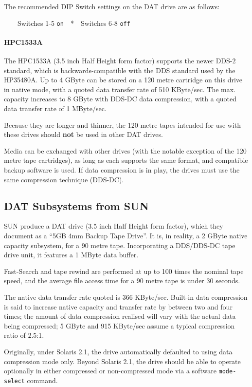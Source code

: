 The recommended DIP Switch settings on the DAT drive are as follows:

\ \ \ \ Switches 1-5 {\tt on}\ \ *\ \ Switches 6-8 {\tt off}

\paragraph {HPC1533A}

The HPC1533A (3.5 inch Half Height form factor) supports the newer DDS-2
standard, which is backwards-compatible with the DDS standard used by the
HP35480A. Up to 4 GByte can be stored on a 120 metre cartridge on this drive
in native mode, with a quoted data transfer rate of 510 KByte/sec. The max.
capacity increases to 8 GByte with DDS-DC data compression, with a quoted data
transfer rate of 1 MByte/sec.

Because they are longer and thinner, the 120 metre tapes intended for use
with these drives should {\bf not} be used in other DAT drives.

Media can be exchanged with other drives (with the notable exception of the
120 metre tape cartridges), as long as each supports the same format, and
compatible backup software is used. If data compression is in play, the
drives must use the same compression technique (DDS-DC).

\subsection {DAT Subsystems from SUN}

SUN produce a DAT drive (3.5 inch Half Height form factor), which they
document as a ``5GB 4mm Backup Tape Drive''. It is, in reality, a 2 GByte
native capacity subsystem, for a 90 metre tape. Incorporating a DDS/DDS-DC
tape drive unit, it features a 1 MByte data buffer.

Fast-Search and tape rewind are performed at up to 100 times the nominal
tape speed, and the average file access time for a 90 metre tape is under
30 seconds.

The native data transfer rate quoted is 366 KByte/sec.  Built-in data
compression is said to increase native capacity and transfer rate by between
two and four times; the amount of data compression realised will vary with
the actual data being compressed; 5 GByte and 915 KByte/sec assume a typical
compression ratio of 2.5:1.

Originally, under Solaris 2.1, the drive automatically defaulted to using
data compression mode only. Beyond Solaris 2.1, the drive should be able to
operate optionally in either compressed or non-compressed mode via a
software {\tt mode-select} command.

